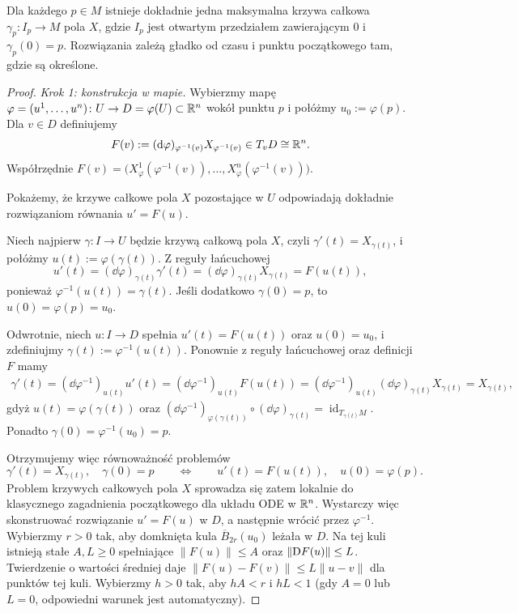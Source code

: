 \begin{twierdzenie}
\label{thm:ode}
Dla każdego $p\in M$ istnieje dokładnie jedna maksymalna krzywa
całkowa $\gamma_p\colon I_p\to M$ pola $X$, gdzie $I_p$ jest otwartym
przedziałem zawierającym $0$ i $\gamma_p(0)=p$.
Rozwiązania zależą gładko od czasu i punktu początkowego tam,
gdzie są określone.
\end{twierdzenie}
\begin{proof}
\emph{Krok 1: konstrukcja w mapie.}
Wybierzmy mapę $\varphi=(u^1,\ldots,u^n)\colon U\to D=\varphi(U)\subset\mathbb{R}^n$
wokół punktu $p$ i połóżmy $u_0:=\varphi(p)$. Dla $v\in D$ definiujemy
\[
F(v):=(\mathrm d\varphi)_{\varphi^{-1}(v)}
X_{\varphi^{-1}(v)}\in T_vD\cong\mathbb{R}^n.
\]
Współrzędnie
$F(v)=\bigl(X_\varphi^1(\varphi^{-1}(v)),\ldots,
X_\varphi^n(\varphi^{-1}(v))\bigr)$.

Pokażemy, że krzywe całkowe pola $X$ pozostające w $U$ odpowiadają
dokładnie rozwiązaniom równania $u'=F(u)$.

Niech najpierw $\gamma\colon I\to U$ będzie krzywą całkową pola $X$,
czyli $\gamma'(t)=X_{\gamma(t)}$, i połóżmy
$u(t):=\varphi(\gamma(t))$. Z reguły łańcuchowej
\[
u'(t)
=(\dd\varphi)_{\gamma(t)}\gamma'(t)
=(\dd\varphi)_{\gamma(t)}X_{\gamma(t)}
=F(u(t)),
\]
ponieważ $\varphi^{-1}(u(t))=\gamma(t)$. Jeśli dodatkowo
$\gamma(0)=p$, to $u(0)=\varphi(p)=u_0$.

Odwrotnie, niech $u\colon I\to D$ spełnia $u'(t)=F(u(t))$ oraz
$u(0)=u_0$, i zdefiniujmy $\gamma(t):=\varphi^{-1}(u(t))$.
Ponownie z reguły łańcuchowej oraz definicji $F$ mamy
\begin{align*}
\gamma'(t)
=(\dd\varphi^{-1})_{u(t)}u'(t)
=(\dd\varphi^{-1})_{u(t)}F(u(t))
=(\dd\varphi^{-1})_{u(t)}
  (\dd\varphi)_{\gamma(t)}X_{\gamma(t)}
=X_{\gamma(t)},
\end{align*}
gdyż $u(t)=\varphi(\gamma(t))$ oraz
$(\dd\varphi^{-1})_{\varphi(\gamma(t))}
\circ(\dd\varphi)_{\gamma(t)}
=\operatorname{id}_{T_{\gamma(t)}M}$.
Ponadto $\gamma(0)=\varphi^{-1}(u_0)=p$.

Otrzymujemy więc równoważność problemów
\[
\gamma'(t)=X_{\gamma(t)},\quad \gamma(0)=p
\qquad\Longleftrightarrow\qquad
u'(t)=F(u(t)),\quad u(0)=\varphi(p).
\]
Problem krzywych całkowych pola $X$ sprowadza się zatem lokalnie
do klasycznego zagadnienia początkowego dla układu ODE w $\mathbb{R}^n$.
Wystarczy więc skonstruować rozwiązanie $u'=F(u)$ w $D$,
a następnie wrócić przez $\varphi^{-1}$.
Wybierzmy $r>0$ tak, aby domknięta kula
$\overline B_{2r}(u_0)$ leżała w $D$.
Na tej kuli istnieją stałe $A,L\geq 0$ spełniające
$\|F(u)\|\leq A$ oraz $\|\mathrm D F(u)\|\leq L$.
Twierdzenie o wartości średniej daje
$\|F(u)-F(v)\|\leq L\|u-v\|$ dla punktów tej kuli.
Wybierzmy $h>0$ tak, aby $hA<r$ i $hL<1$
(gdy $A=0$ lub $L=0$, odpowiedni warunek jest automatyczny).


\end{proof}
